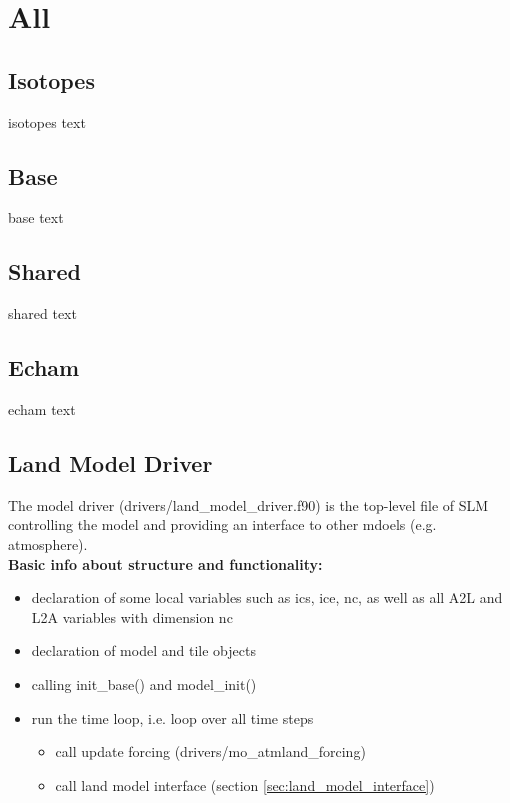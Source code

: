 \chapter{All}\label{ch:all_base_driver}


\section{Isotopes}\label{sec:isotopes}


isotopes text


\section{Base}\label{sec:base}


base text


\section{Shared}\label{sec:shared}


shared text


\section{Echam}\label{sec:echam}


echam text


\newpage
\section{Land Model Driver}\label{sec:land_model_driver}
The model driver (drivers/land{\_}model{\_}driver.f90) is the top-level file of SLM controlling the model and providing an interface to other mdoels (e.g. atmosphere).
~\\

\textbf{Basic info about structure and functionality:}
\begin{itemize}
\item declaration of some local variables such as ics, ice, nc, as well as all A2L and L2A variables with dimension nc
\item declaration of model and tile objects
\item calling init\_base() and model\_init()
\item run the time loop, i.e. loop over all time steps
\begin{itemize}
\item call update forcing (drivers/mo{\_}atmland{\_}forcing)
\item call land model interface (section \ref{sec:land_model_interface})
\end{itemize}
\end{itemize}


